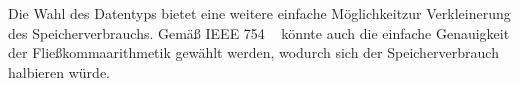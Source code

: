 \documentclass[course=erap] {aspdoc}
\begin{document}
    Die Wahl des Datentyps bietet eine weitere einfache Möglichkeitzur Verkleinerung des Speicherverbrauchs. Gemäß IEEE 754 ~\cite{StandardforBinaryFloating} könnte auch die einfache Genauigkeit der Fließkommaarithmetik gewählt werden, wodurch sich der Speicherverbrauch halbieren würde.

    
    
\end{document}
